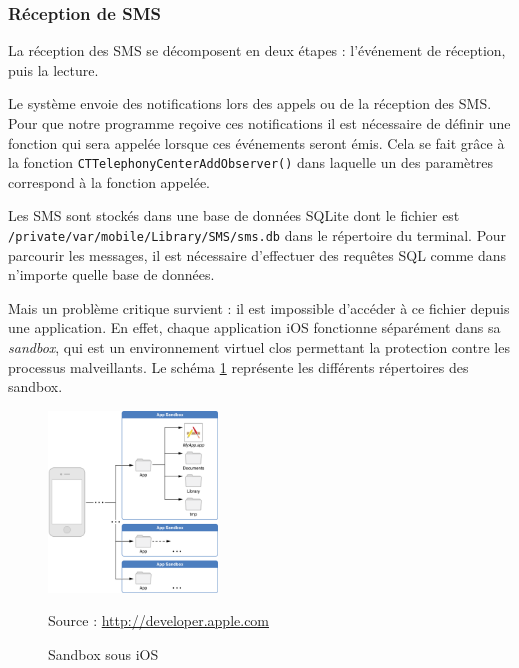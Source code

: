 \subsubsection{Réception de SMS}
\label{III_iOS_receptionSMS}

La réception des SMS se décomposent en deux étapes : l'événement de réception, puis la lecture.



Le système envoie des notifications lors des appels ou de la réception des SMS.
Pour que notre programme reçoive ces notifications il est nécessaire de définir une fonction qui sera appelée lorsque ces événements seront émis.
Cela se fait grâce à la fonction \lstinline{CTTelephonyCenterAddObserver()} dans laquelle un des paramètres correspond à la fonction appelée.



Les SMS sont stockés dans une base de données SQLite dont le fichier est \lstinline{/private/var/mobile/Library/SMS/sms.db} dans le répertoire du terminal.
Pour parcourir les messages, il est nécessaire d'effectuer des requêtes SQL comme dans n'importe quelle base de données.

Mais un problème critique survient : il est impossible d'accéder à ce fichier depuis une application.
En effet, chaque application iOS fonctionne séparément dans sa \textit{sandbox}, qui est un environnement virtuel clos permettant la protection contre les processus malveillants.
Le schéma \ref{iOS_sandbox} représente les différents répertoires des sandbox.
\begin{figure}[!h]
	\center
	\includegraphics[width=0.4\textwidth]{img/iOS_sandbox.png}
	\caption{Sandbox sous iOS}
	Source : \href{http://developer.apple.com/library/ios/#documentation/iphone/conceptual/iphoneosprogrammingguide/TheiOSEnvironment/TheiOSEnvironment.html}{http://developer.apple.com}
	\label{iOS_sandbox}
\end{figure}


